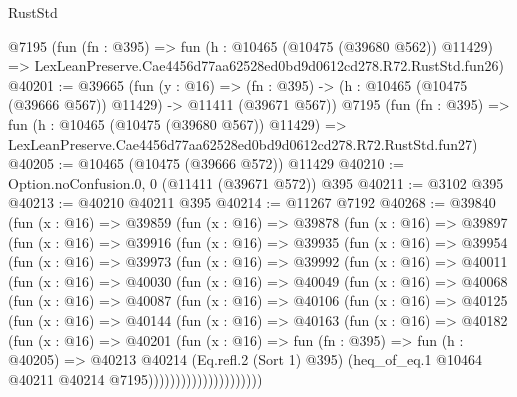 \begin{lexlean}{RustStd}
\begin{coremodule}
    @7195
    (fun (fn : @395) =>
    fun (h : @10465 (@10475 (@39680 @562)) @11429) =>
    LexLeanPreserve.Cae4456d77aa62528ed0bd9d0612cd278.R72.RustStd.fun26)
@40201 := @39665
    (fun (y : @16) =>
    (fn : @395) -> (h : @10465 (@10475 (@39666 @567)) @11429) -> @11411 (@39671 @567))
    @7195
    (fun (fn : @395) =>
    fun (h : @10465 (@10475 (@39680 @567)) @11429) =>
    LexLeanPreserve.Cae4456d77aa62528ed0bd9d0612cd278.R72.RustStd.fun27)
@40205 := @10465 (@10475 (@39666 @572)) @11429
@40210 := Option.noConfusion.{0, 0} (@11411 (@39671 @572)) @395
@40211 := @3102 @395
@40213 := @40210 @40211 @395
@40214 := @11267 @7192
@40268 := @39840
    (fun (x : @16) =>
    @39859
      (fun (x : @16) =>
      @39878
        (fun (x : @16) =>
        @39897
          (fun (x : @16) =>
          @39916
            (fun (x : @16) =>
            @39935
              (fun (x : @16) =>
              @39954
                (fun (x : @16) =>
                @39973
                  (fun (x : @16) =>
                  @39992
                    (fun (x : @16) =>
                    @40011
                      (fun (x : @16) =>
                      @40030
                        (fun (x : @16) =>
                        @40049
                          (fun (x : @16) =>
                          @40068
                            (fun (x : @16) =>
                            @40087
                              (fun (x : @16) =>
                              @40106
                                (fun (x : @16) =>
                                @40125
                                  (fun (x : @16) =>
                                  @40144
                                    (fun (x : @16) =>
                                    @40163
                                      (fun (x : @16) =>
                                      @40182
                                        (fun (x : @16) =>
                                        @40201
                                          (fun (x : @16) =>
                                          fun (fn : @395) =>
                                          fun (h : @40205) =>
                                          @40213
                                            @40214
                                            (Eq.refl.{2} (Sort 1) @395)
                                            (heq_of_eq.{1}
                                              @10464
                                              @40211
                                              @40214
                                              @7195)))))))))))))))))))))

\end{coremodule}
\end{lexlean}
